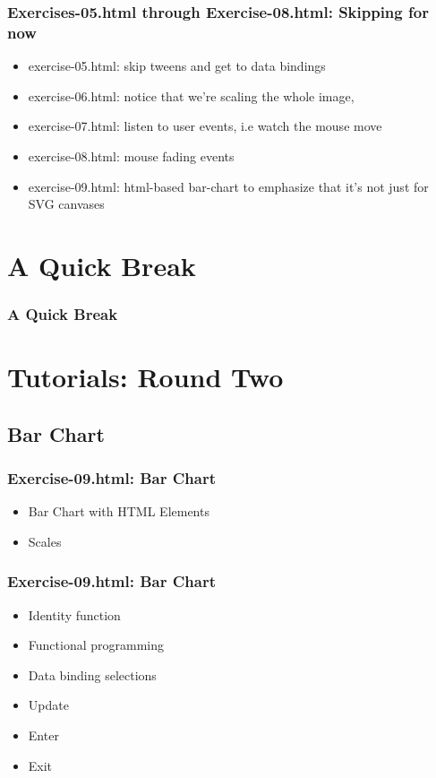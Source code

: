 \documentclass{beamer}
\begin{document}
\begin{frame}
    \frametitle{Exercises-05.html through Exercise-08.html: Skipping for now}
    \begin{itemize}
    \item exercise-05.html: skip tweens and get to data bindings
    \item exercise-06.html: notice that we're scaling the whole image,
    \item exercise-07.html: listen to user events, i.e watch the mouse move
    \item exercise-08.html: mouse fading events
    \item exercise-09.html: html-based bar-chart to emphasize that it's not just for SVG canvases
    \end{itemize}
\end{frame}


\section{A Quick Break}

\begin{frame}
    \frametitle{A Quick Break}
\end{frame}


\section{Tutorials: Round Two}


\subsection{Bar Chart}


\begin{frame}
    \frametitle{Exercise-09.html: Bar Chart}
    \begin{itemize}
    \item Bar Chart with HTML Elements
    \item Scales
    \end{itemize}
\end{frame}


\begin{frame}
    \frametitle{Exercise-09.html: Bar Chart}
    \begin{itemize}
    \item Identity function
    \item Functional programming
    \item Data binding selections
    \item Update
    \item Enter
    \item Exit
    \end{itemize}
\end{frame}
\end{document}
